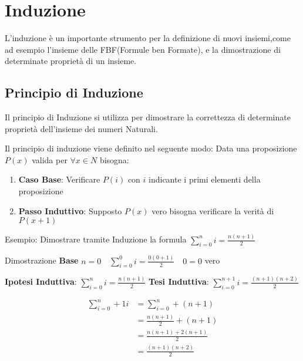 \chapter{Induzione}
L'induzione è un importante strumento per la definizione di nuovi insiemi,come
ad esempio l'insieme delle FBF(Formule ben Formate), e la dimostrazione di determinate
proprietà di un insieme.

\section{Principio di Induzione}
Il principio di Induzione si utilizza per dimostrare la correttezza di determinate
proprietà dell'insieme dei numeri Naturali.

Il principio di induzione viene definito nel seguente modo:\newline
Data una proposizione $P(x)$ valida per $\forall x \in N$ bisogna:
\begin{enumerate}
  \item \textbf{Caso Base}: Verificare $P(i)$ con $i$ indicante i primi elementi della proposizione
  \item \textbf{Passo Induttivo}: Supposto $P(x)$ vero  bisogna verificare la verità di $P(x+1)$
\end{enumerate}

Esempio:\newline
Dimostrare tramite Induzione la formula $\displaystyle \sum_{i = 0} ^ n i = \frac{n(n + 1)}{2}$

Dimostrazione \newline
\textbf{Base} $n = 0 \quad \displaystyle \sum_{i = 0} ^ 0 i = \frac{0(0 + 1)}{2} \quad 0 = 0$ vero

\textbf{Ipotesi Induttiva}: $\displaystyle \sum_{i = 0} ^ n i = \frac{n(n+1)}{2}$ \newline
\textbf{Tesi Induttiva}: $\displaystyle \sum_{i = 0} ^ {n+1} i = \frac{(n+1)(n+2)}{2}$

\begin{equation*}
\begin{split}
  \sum_{i = 0}^n+1 i & = \sum_{i = 0} ^ n + (n+1) \\
                     & = \frac{n(n+1)}{2} + (n+1) \\
                     & = \frac{n(n+1) + 2(n+1)}{2} \\
                     & = \frac{(n+1)(n+2)}{2} \\
\end{split}
\end{equation*}

